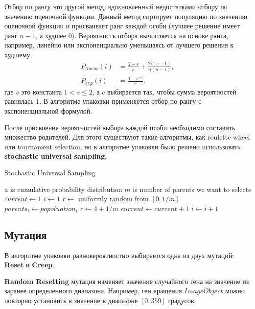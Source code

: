 \documentclass{fefu_thesis/cls/fefu}
\newenvironment{algo}[1][]
  {\begin{algorithm}[#1]
     \selectlanguage{english}
     \floatname{algorithm}{Алгоритм}
  }
  {\end{algorithm}}
\begin{document}
    Отбор по рангу\cite{RankingSelection} это другой метод, вдохновленный недостатками отбору по значению оценочной функции. Данный метод сортирует популяцию по значению оценочной функции и присваивает ранг каждой особи (лучшее решение имеет ранг $n - 1$, а худшее $0$). Вероятность отбора вычисляется на основе ранга, например, линейно или экспоненциально уменьшаясь от лучшего решения к худшему,
    \begin{align*}
        P_{linear}\left(i\right) &= \frac{2 - s}{n} + \frac{2i\left(s - 1\right)}{n\left(n - 1\right)},\\
        P_{exp}\left(i\right) &= \frac{1 - e^{-i}}{c}.
    \end{align*}
    где $s$ это константа $1 < s\leq 2$, а $c$ выбирается так, чтобы сумма вероятностей равнялась $1$. В алгоритме упаковки применяется отбор по рангу с экспоненциальной формулой.

    После присвоения вероятностей выбора каждой особи необходимо составить множество родителей. Для этого существуют такие алгоритмы, как roulette wheel или tournament selection, но в алгоритме упаковки было решено использовать \textbf{stochastic universal sampling}\cite{RankingSelection}.

    \begin{algo}[H]
        \caption{Stochastic Universal Sampling}
        \begin{algorithmic}[1]
            \State $a$ is cumulative probability distribution
            \State $m$ is number of parents we want to selects
            \State $current \gets 1$
            \State $i \gets 1$
            \State $r \gets$ uniformly random from $\left[0, 1 / m\right]$
                    \State $parents_i \gets popoluation_i$
                    \State $r \gets 4 + 1 / m$
                    \State $current \gets current + 1$
                \EndWhile
                \State $i \gets i + 1$
            \EndWhile
        \end{algorithmic}
    \end{algo}

    \subsection{Мутация}
    В алгоритме упаковки равновероятностно выбирается одна из двух мутаций: \textbf{Reset} и \textbf{Creep}.

    \textbf{Random Resetting} мутация изменяет значение случайного гена на значение из заранее определенного диапазона. Например, ген вращения $ImageObject$ можно повторно установить в значение в диапазоне $\left[0, 359\right]$ градусов.
\end{document}
